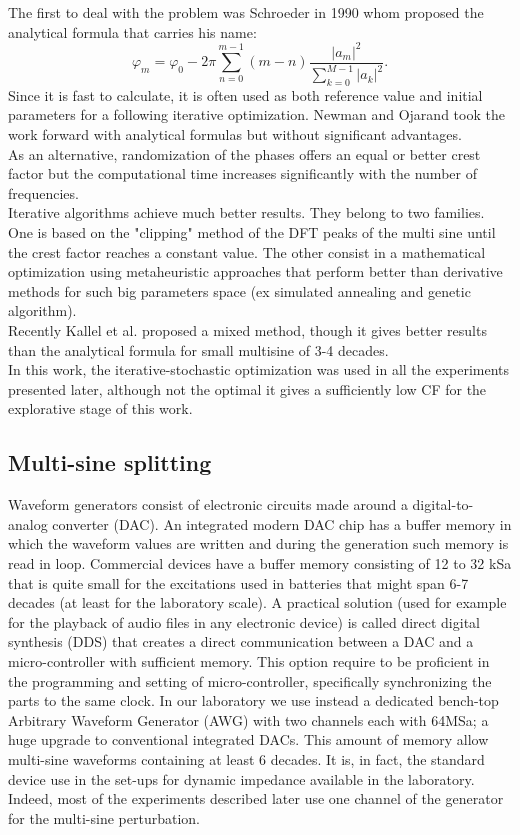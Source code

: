 The first to deal with the problem was Schroeder in 1990 whom proposed the analytical formula that carries his name:
$$
\varphi_m = \varphi _0 - 2 \pi \sum _{n=0} ^{m-1} (m-n) \frac{|a_m|^2}{\sum_{k=0}^{M-1}|a_k|^2}. 
$$
Since it is fast to calculate, it is often used as both  reference value and initial parameters for a following iterative optimization. Newman and Ojarand took the work forward with analytical formulas but without significant advantages.\\

As an alternative, randomization of the phases offers an equal or better crest factor but the computational time increases significantly with the number of frequencies.\\

Iterative algorithms achieve much better results. They belong to two families. One is based on the "clipping" method of the DFT peaks of the multi sine until the crest factor reaches a constant value. The other consist in a mathematical optimization using metaheuristic approaches that perform better than derivative methods for such big parameters space (ex simulated annealing and genetic algorithm).\\

Recently Kallel et al. proposed a mixed method, though it gives better results than the analytical formula for small multisine of 3-4 decades.\\

In this work, the iterative-stochastic optimization was used in all the experiments presented later, although not the optimal it gives a sufficiently low CF for the explorative stage of this work.\\

\subsection{Multi-sine splitting}

Waveform generators consist of electronic circuits made around a digital-to-analog converter (DAC). An integrated modern DAC chip has a buffer memory in which the waveform values are written and during the generation such memory is read in loop.  Commercial devices have a buffer memory consisting of 12 to 32 kSa that is quite small for the excitations used in batteries that might span 6-7 decades (at least for the laboratory scale). A practical solution (used for example for the playback of audio files in any electronic device) is called direct digital synthesis (DDS) that creates a direct communication between a DAC and a micro-controller with sufficient memory. This option require to be proficient in the programming and setting of micro-controller, specifically synchronizing the parts to the same clock. In our laboratory we use instead a dedicated bench-top Arbitrary Waveform Generator (AWG) with two channels each with 64MSa; a huge upgrade to conventional integrated DACs. This amount of memory allow multi-sine waveforms containing at least 6 decades. It is, in fact, the standard device use in the set-ups for dynamic impedance available in the laboratory.  Indeed, most of the experiments described later use one channel of the generator for the multi-sine perturbation. \\

